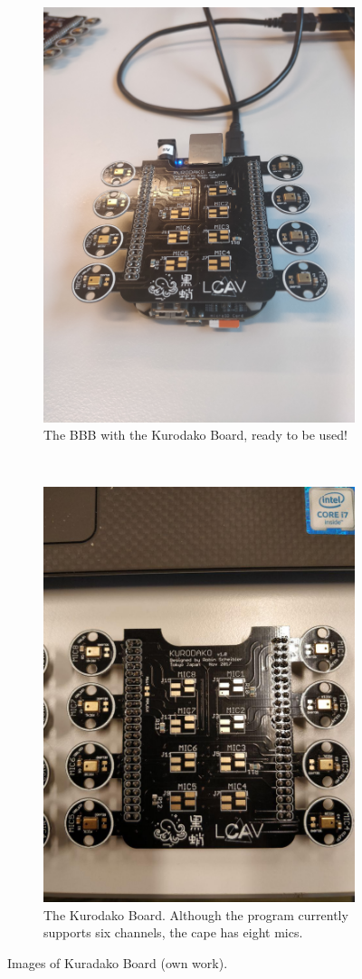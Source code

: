 \documentclass[]{report}
\begin{document}
\begin{figure}[H]
	\centering
	\begin{subfigure}[t]{0.5\textwidth}
		\centering
		\includegraphics[width=0.8\linewidth]{Pictures/BBBkurodako.jpg}
		\caption{The BBB with the Kurodako Board, ready to be used!}
	\end{subfigure}%
	~ 
	\begin{subfigure}[t]{0.5\textwidth}
		\centering
		\includegraphics[width=0.8\linewidth]{Pictures/kurodako.jpg}
		\caption{The Kurodako Board. Although the program currently supports six
			channels, the cape has eight mics.}
	\end{subfigure}
	\caption{Images of Kuradako Board (own work).}
\end{figure}
\end{document}
